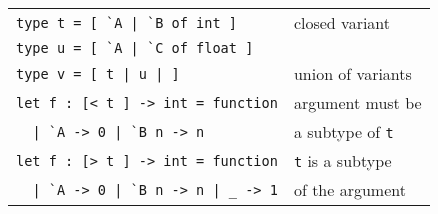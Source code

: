 \documentclass[10pt,landscape]{article}
\begin{document}
\begin{multicols}{3}
\begin{tabular}{ll}
\verb!type t = [ `A | `B of int ]! & closed variant \\
\verb!type u = [ `A | `C of float ]! & \\
\verb!type v = [ t | u | ]! & union of variants \\
\verb!let f : [< t ] -> int = function! & argument must be\\
\verb!  | `A -> 0 | `B n -> n! & \hfill a subtype of \verb!t!\\
\verb!let f : [> t ] -> int = function! & \verb!t! is a subtype \\
\verb!  | `A -> 0 | `B n -> n | _ -> 1! & \hfill of the argument \\
\end{tabular}

\end{multicols}
\end{document}
